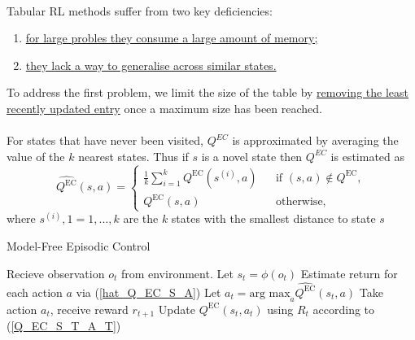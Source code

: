 \documentclass[12pt,a4paper]{article}
\begin{document}
\paragraph{}Tabular RL methods suffer from two key deficiencies:
\begin{enumerate}
	\item \uline{for large probles they consume a large amount of memory;}
	\item \uline{they lack a way to generalise across similar states.}
\end{enumerate}
To address the first problem, we limit the size of the table by \uline{removing the least recently updated entry} once a maximum size has been reached.

\paragraph{}For states that have never been visited, $Q^{EC}$ is approximated by averaging the value of the $k$ nearest states. Thus if $s$ is a novel state then $Q^{EC}$ is estimated as 
\begin{equation}\label{hat_Q_EC_S_A}
\widehat{Q^{\text{EC}}}(s, a) = \left\lbrace
\begin{array}{lcl}
\frac{1}{k}\sum_{i=1}^{k}Q^{\text{EC}}(s^{(i)}, a) & & \text{if } (s,a) \notin Q^{\text{EC}},\\
Q^{\text{EC}}(s,a) & & \text{otherwise,}
\end{array} \right.
\end{equation}
where $s^{(i)}, 1 = 1, ..., k$ are the $k$ states with the smallest distance to state $s$
\begin{algorithm}
	\caption{Model-Free Episodic Control}
	\begin{algorithmic}
				\State Recieve observation $o_{t}$ from environment.
				\State Let $s_{t} = \phi(o_{t})$
				\State Estimate return for each action $a$ via (\ref{hat_Q_EC_S_A})
				\State Let $a_{t} = \text{arg max}_{a}\widehat{Q^{\text{EC}}}(s_{t},a)$
				\State Take action $a_{t}$, receive reward $r_{t+1}$
			\EndFor
				\State Update $Q^{\text{EC}}(s_{t}, a_{t})$ using $R_{t}$ according to (\ref{Q_EC_S_T_A_T})
			\EndFor
		\EndFor
	\end{algorithmic}
\end{algorithm}


\end{document}
